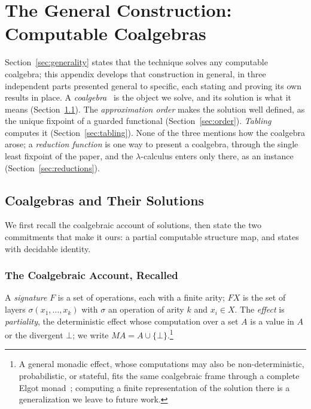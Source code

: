 \section{The General Construction: Computable Coalgebras}\label{sec:method}
Section~\ref{sec:generality} states that the technique solves any computable coalgebra; this appendix develops that construction in general, in three independent parts presented general to specific, each stating and proving its own results in place. A \emph{coalgebra}~\cite{rutten2000-universal-coalgebra} is the object we solve, and its solution is what it means (Section~\ref{sec:coalgebras}). The \emph{approximation order} makes the solution well defined, as the unique fixpoint of a guarded functional (Section~\ref{sec:order}). \emph{Tabling} computes it (Section~\ref{sec:tabling}). None of the three mentions how the coalgebra arose; a \emph{reduction function} is one way to present a coalgebra, through the single least fixpoint of the paper, and the $\lambda$-calculus enters only there, as an instance (Section~\ref{sec:reductions}).

\subsection{Coalgebras and Their Solutions}\label{sec:coalgebras}

We first recall the coalgebraic account of solutions, then state the two commitments that make it ours: a partial computable structure map, and states with decidable identity.

\subsubsection{The Coalgebraic Account, Recalled}

\begin{definition}\label{def:signature}
  A \emph{signature} $F$ is a set of operations, each with a finite arity; $F X$ is the set of layers $\sigma(x_1,\dots,x_k)$ with $\sigma$ an operation of arity $k$ and $x_i \in X$. The \emph{effect} is \emph{partiality}, the deterministic effect whose computation over a set $A$ is a value in $A$ or the divergent $\bot$; we write $M A = A \cup \{\bot\}$.\footnote{A general monadic effect, whose computations may also be non-deterministic, probabilistic, or stateful, fits the same coalgebraic frame through a complete Elgot monad~\cite{adamek2006-iterative-algebras, goncharov2016-complete-elgot-monads}; computing a finite representation of the solution there is a generalization we leave to future work.}
\end{definition}

